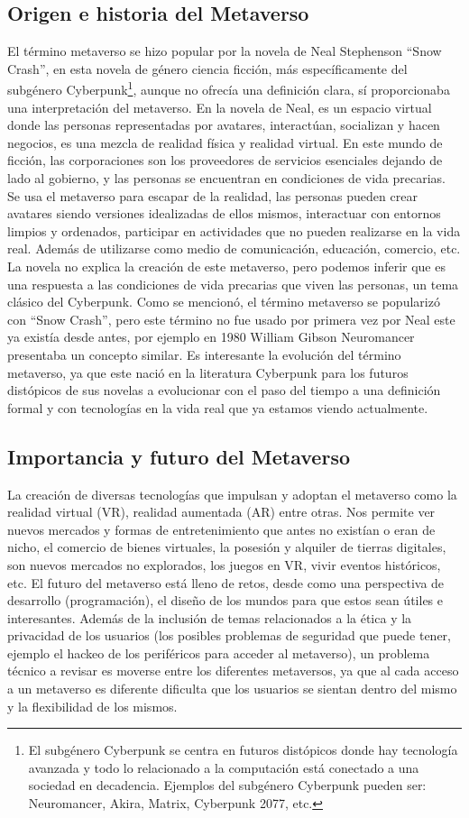 \documentclass[a4paper,10pt]{article}
\begin{document}
	\subsection{Origen e historia del Metaverso}
	El término metaverso se hizo popular por la novela de Neal Stephenson “Snow Crash”, en esta novela de género ciencia ficción, más específicamente del subgénero Cyberpunk\footnote{El subgénero Cyberpunk se centra en futuros distópicos donde hay tecnología avanzada y todo lo relacionado a la computación está conectado a una sociedad en decadencia. Ejemplos del subgénero Cyberpunk pueden ser: Neuromancer, Akira, Matrix, Cyberpunk 2077, etc.}, 
	aunque no ofrecía una definición clara, sí proporcionaba una interpretación del metaverso. En la novela de Neal, es un espacio virtual donde las personas representadas por avatares, interactúan, socializan y hacen negocios, es una mezcla de realidad física y realidad virtual. En este mundo de ficción, las corporaciones son los proveedores de servicios esenciales dejando de lado al gobierno, y las personas se encuentran en condiciones de vida precarias. Se usa el metaverso para escapar de la realidad, las personas pueden crear avatares siendo versiones idealizadas de ellos mismos, interactuar con entornos limpios y ordenados, participar en actividades que no pueden realizarse en la vida real. Además de utilizarse como medio de comunicación, educación, comercio, etc. La novela no explica la creación de este metaverso, pero podemos inferir que es una respuesta a las condiciones de vida precarias que viven las personas, un tema clásico del Cyberpunk.
	Como se mencionó, el término metaverso se popularizó con “Snow Crash”, pero este término no fue usado por primera vez por Neal este ya existía desde antes, por ejemplo en 1980 William Gibson Neuromancer presentaba un concepto similar. Es interesante la evolución del término metaverso, ya que este nació en la literatura Cyberpunk para los futuros distópicos de sus novelas a evolucionar con el paso del tiempo a una definición formal y con tecnologías en la vida real que ya estamos viendo actualmente.
	
	\subsection{Importancia y futuro del Metaverso}
	La creación de diversas tecnologías que impulsan y adoptan el metaverso como la realidad virtual (VR), realidad aumentada (AR) entre otras. Nos permite ver nuevos mercados y formas de entretenimiento que antes no existían o eran de nicho, el comercio de bienes virtuales, la posesión y alquiler de tierras digitales, son nuevos mercados no explorados, los juegos en VR, vivir eventos históricos, etc. El futuro del metaverso está lleno de retos, desde como una perspectiva de desarrollo (programación), el diseño de los mundos para que estos sean útiles e interesantes. Además de la inclusión de temas relacionados a la ética y la privacidad de los usuarios (los posibles problemas de seguridad que puede tener, ejemplo el hackeo de los periféricos para acceder al metaverso), un problema técnico a revisar es moverse entre los diferentes metaversos, ya que al cada acceso a un metaverso es diferente dificulta que los usuarios se sientan dentro del mismo y la flexibilidad de los mismos.
\end{document}
